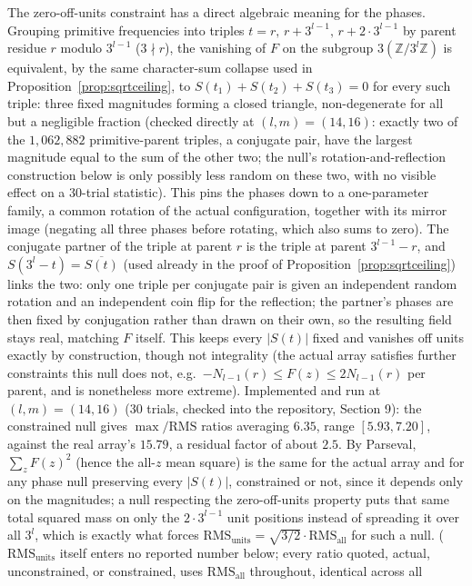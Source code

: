 \documentclass[11pt]{amsart}
\theoremstyle{plain}
\theoremstyle{definition}
\theoremstyle{remark}
\newcommand{\Z}{\mathbb{Z}}
\begin{document}
The zero-off-units constraint has a direct algebraic meaning for the phases. Grouping primitive
frequencies into triples $t=r,\,r+3^{l-1},\,r+2\cdot3^{l-1}$ by parent residue $r$ modulo $3^{l-1}$
($3\nmid r$), the vanishing of $F$ on the subgroup $3(\Z/3^l\Z)$ is equivalent, by the same
character-sum collapse used in Proposition~\ref{prop:sqrtceiling}, to $S(t_1)+S(t_2)+S(t_3)=0$ for
every such triple: three fixed magnitudes forming a closed triangle, non-degenerate for all but a
negligible fraction (checked directly at $(l,m)=(14,16)$: exactly two of the $1{,}062{,}882$
primitive-parent triples, a conjugate pair, have the largest magnitude equal to the sum of the
other two; the null's rotation-and-reflection construction below is only possibly less random on
these two, with no visible effect on a $30$-trial statistic). This pins the
phases down to a one-parameter family, a common rotation of the actual configuration, together with
its mirror image (negating all three phases before rotating, which also sums to zero). The conjugate
partner of the triple at parent $r$ is the triple at parent $3^{l-1}-r$, and $S(3^l-t)=\overline{S(t)}$
(used already in the proof of Proposition~\ref{prop:sqrtceiling}) links the two: only one triple per conjugate pair is given
an independent random rotation and an independent coin flip for the reflection; the partner's
phases are then fixed by conjugation rather than drawn on their own, so the resulting field stays
real, matching $F$ itself. This keeps every $|S(t)|$ fixed and vanishes off units exactly by
construction, though not integrality (the actual array satisfies further constraints this null does
not, e.g.\ $-N_{l-1}(r)\le F(z)\le2N_{l-1}(r)$ per parent, and is nonetheless more extreme).
Implemented and run at $(l,m)=(14,16)$ (30 trials, checked into the repository, Section
9): the constrained null gives $\max/\mathrm{RMS}$ ratios averaging $6.35$, range $[5.93,7.20]$,
against the real array's $15.79$, a residual factor of about $2.5$. By Parseval, $\sum_z F(z)^2$
(hence
the all-$z$ mean square) is the same for the actual array and for any phase null preserving every
$|S(t)|$, constrained or not, since it depends only on the magnitudes; a null respecting the
zero-off-units property puts that same total squared mass on only the $2\cdot3^{l-1}$ unit positions
instead of spreading it over all $3^l$, which is exactly what forces
$\mathrm{RMS}_{\mathrm{units}}=\sqrt{3/2}\cdot\mathrm{RMS}_{\mathrm{all}}$ for such a null.
($\mathrm{RMS}_{\mathrm{units}}$ itself enters no reported number below; every ratio quoted, actual,
unconstrained, or constrained, uses $\mathrm{RMS}_{\mathrm{all}}$ throughout, identical across all
\end{document}
